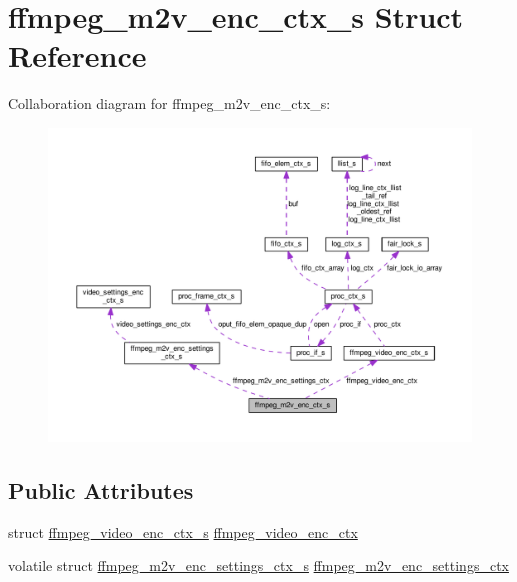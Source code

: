 \hypertarget{structffmpeg__m2v__enc__ctx__s}{}\section{ffmpeg\+\_\+m2v\+\_\+enc\+\_\+ctx\+\_\+s Struct Reference}
\label{structffmpeg__m2v__enc__ctx__s}


Collaboration diagram for ffmpeg\+\_\+m2v\+\_\+enc\+\_\+ctx\+\_\+s\+:\nopagebreak
\begin{figure}[H]
\begin{center}
\leavevmode
\includegraphics[width=350pt]{structffmpeg__m2v__enc__ctx__s__coll__graph}
\end{center}
\end{figure}
\subsection*{Public Attributes}
\begin{DoxyCompactItemize}
\item 
struct \hyperlink{structffmpeg__video__enc__ctx__s}{ffmpeg\+\_\+video\+\_\+enc\+\_\+ctx\+\_\+s} \hyperlink{structffmpeg__m2v__enc__ctx__s_aad391a4d54718c539a2dabd196552493}{ffmpeg\+\_\+video\+\_\+enc\+\_\+ctx}
\item 
volatile struct \hyperlink{structffmpeg__m2v__enc__settings__ctx__s}{ffmpeg\+\_\+m2v\+\_\+enc\+\_\+settings\+\_\+ctx\+\_\+s} \hyperlink{structffmpeg__m2v__enc__ctx__s_af0bee743203664961f2a75ac872139fd}{ffmpeg\+\_\+m2v\+\_\+enc\+\_\+settings\+\_\+ctx}
\end{DoxyCompactItemize}


